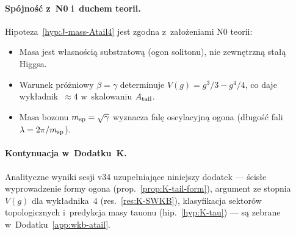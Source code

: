 \paragraph{Spójność z~N0 i~duchem teorii.}
Hipoteza~\ref{hyp:J-mass-Atail4} jest zgodna z~założeniami N0 teorii:
\begin{itemize}[nosep]
  \item[N0-1] Masa jest własnością substratową (ogon solitonu),
    nie zewnętrzną stałą Higgsa.
  \item[N0-5] Warunek próżniowy $\beta = \gamma$ determinuje $V(g) = g^3/3 - g^4/4$,
    co daje wykładnik~$\approx 4$ w~skalowaniu $A_{\rm tail}$.
  \item[N0-6] Masa bozonu $m_{\rm sp} = \sqrt{\gamma}$ wyznacza falę oscylacyjną
    ogona (długość fali $\lambda = 2\pi/m_{\rm sp}$).
\end{itemize}

\paragraph{Kontynuacja w~Dodatku~K.}
Analityczne wyniki sesji v34 uzupełniające niniejszy dodatek --- ścisłe
wyprowadzenie formy ogona (prop.~\ref{prop:K-tail-form}),
argument ze stopnia $V(g)$ dla wykładnika~$4$
(res.~\ref{res:K-SWKB}), klasyfikacja sektorów topologicznych
i~predykcja masy tauonu (hip.~\ref{hyp:K-tau}) ---
są zebrane w~Dodatku~\ref{app:wkb-atail}.

